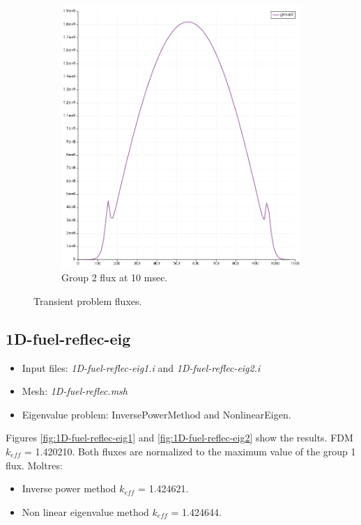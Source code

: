 \documentclass[11pt,letterpaper]{article}
\begin{document}
\begin{figure}[htbp!]
\begin{subfigure}[t]{0.4\textwidth}
			\includegraphics[width=\linewidth]{1D-fuel-reflec-g2}
			\caption{Group 2 flux at 10 msec.}
		\end{subfigure}
		\hfill
		\caption{Transient problem fluxes.}
		\label{fig:1D-fuel-reflec}
	\end{figure}

\subsection{1D-fuel-reflec-eig}

	\begin{itemize}
		\item Input files: \textit{1D-fuel-reflec-eig1.i} and \textit{1D-fuel-reflec-eig2.i}
		\item Mesh: \textit{1D-fuel-reflec.msh}
		\item Eigenvalue problem: InversePowerMethod and NonlinearEigen.
	\end{itemize}

Figures \ref{fig:1D-fuel-reflec-eig1} and \ref{fig:1D-fuel-reflec-eig2} show the results.
FDM $k_{eff}$ = 1.420210. Both fluxes are normalized to the maximum value of the group 1 flux.
Moltres: 
\begin{itemize}
	\item Inverse power method $k_{eff}$ = 1.424621.
	\item Non linear eigenvalue method $k_{eff}$ = 1.424644.
\end{itemize}
\end{document}
